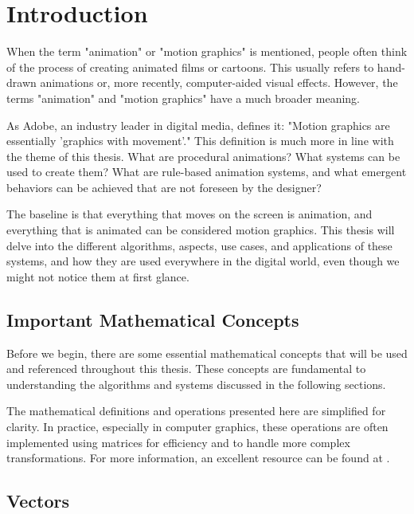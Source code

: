 \section{Introduction}
\label{sec:intro}

When the term "animation" or "motion graphics" is mentioned, people often think of the process of creating animated films or cartoons. This usually refers to hand-drawn animations or, more recently, computer-aided visual effects. However, the terms "animation" and "motion graphics" have a much broader meaning.

As Adobe, an industry leader in digital media, defines it: "Motion graphics are essentially 'graphics with movement'." \cite{adobe-motion-graphics} This definition is much more in line with the theme of this thesis. What are procedural animations? What systems can be used to create them? What are rule-based animation systems, and what emergent behaviors can be achieved that are not foreseen by the designer? 

The baseline is that everything that moves on the screen is animation, and everything that is animated can be considered motion graphics. This thesis will delve into the different algorithms, aspects, use cases, and applications of these systems, and how they are used everywhere in the digital world, even though we might not notice them at first glance.

\subsection{Important Mathematical Concepts}
\label{sec:important-mathematical-concepts}

Before we begin, there are some essential mathematical concepts that will be used and referenced throughout this thesis. These concepts are fundamental to understanding the algorithms and systems discussed in the following sections.

\begin{Note}
    The mathematical definitions and operations presented here are simplified for clarity. In practice, especially in computer graphics, these operations are often implemented using matrices for efficiency and to handle more complex transformations. For more information, an excellent resource can be found at \cite{learn-opengl}.
\end{Note}

\subsection{Vectors}
\label{sec:vectors}

